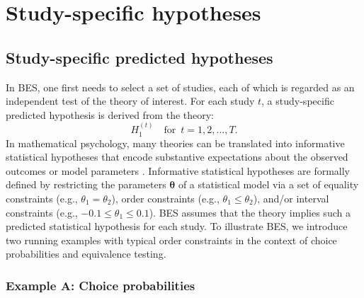\documentclass[letterpaper,11pt,oneside]{article}
\begin{document}

\section{Study-specific hypotheses}

\subsection{Study-specific predicted hypotheses}

In BES, one first needs to select a set of studies, each of which is regarded as an independent test of the theory of interest. For each study $t$, a study-specific predicted hypothesis is derived from the theory:
    \[
    H_1^{(t)} \quad \text{for } \, t = 1,2,\dots,T.
    \]
In mathematical psychology, many theories can be translated into informative statistical hypotheses that encode substantive expectations about the observed outcomes or model parameters \parencite{heckMultinomialModelsLinear2019, heckReviewApplicationsBayes2023}. Informative statistical hypotheses are formally defined by restricting the parameters $\boldsymbol{\theta}$ of a statistical model via a set of equality constraints (e.g., $\theta_1=\theta_2$), order constraints (e.g., $\theta_1 \leq \theta_2$), and/or interval constraints (e.g., $-0.1 \leq \theta_1 \leq 0.1$). BES assumes that the theory implies such a predicted statistical hypothesis for each study. To illustrate BES, we introduce two running examples with typical order constraints in the context of choice probabilities and equivalence testing.

\subsubsection{Example A: Choice probabilities}
\end{document}
